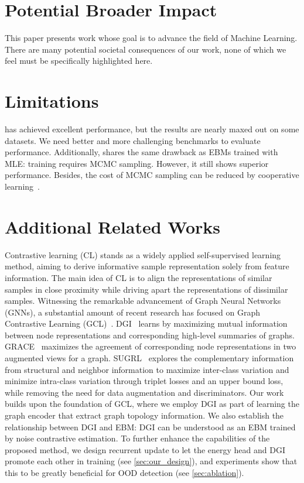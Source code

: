 \clearpage
\appendix
\label{sec:appedix}

\section{Potential Broader Impact}
\label{app:broader_impact}
This paper presents work whose goal is to advance the field of Machine Learning. There are many potential societal consequences of our work, none of which we feel must be specifically highlighted here.

\section{Limitations}
\label{sec:limitation}
\shortname has achieved excellent performance, but the results are nearly maxed out on some datasets. We need better and more challenging benchmarks to evaluate performance. Additionally, \shortname shares the same drawback as EBMs trained with MLE: training requires MCMC sampling. However, it still shows superior performance. Besides, the cost of MCMC sampling can be reduced by cooperative learning~\citep{xie2018cooperative,coopvaebm,ecvae}.


\section{Additional Related Works}
Contrastive learning (CL) stands as a widely applied self-supervised learning method, aiming to derive informative sample representation solely from feature information. 
The main idea of CL is to align the representations of similar samples in close proximity while driving apart the representations of dissimilar samples.
Witnessing the remarkable advancement of Graph Neural Networks (GNNs), a substantial amount of recent research has focused on Graph Contrastive Learning (GCL)~\citep{dgi,gmi,mvgrl,grace,sugrl}. 
DGI~\citep{dgi} learns by maximizing mutual information between node representations and corresponding high-level summaries of graphs. 
GRACE~\citep{grace} maximizes the agreement of corresponding node representations in two augmented views for a graph. 
SUGRL~\citep{sugrl} explores the complementary information from structural and neighbor information to maximize inter-class variation and minimize intra-class variation through triplet losses and an upper bound loss, while removing the need for data augmentation and discriminators. 
Our work builds upon the foundation of GCL, where we employ DGI as part of learning the graph encoder that extract graph topology information. We also establish the relationship between DGI and EBM: DGI can be understood as an EBM trained by noise contrastive estimation. To further enhance the capabilities of the proposed method, we design recurrent update to let the energy head and DGI promote each other in training (see \cref{sec:our_design}), and experiments show that this to be greatly beneficial for OOD detection (see \cref{sec:ablation}). 


